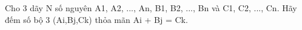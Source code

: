 Cho 3 dãy N số nguyên A1, A2, ..., An, B1, B2, ..., Bn và C1, C2, ..., Cn. Hãy đếm số bộ 3 (Ai,Bj,Ck) thỏa mãn Ai + Bj = Ck.